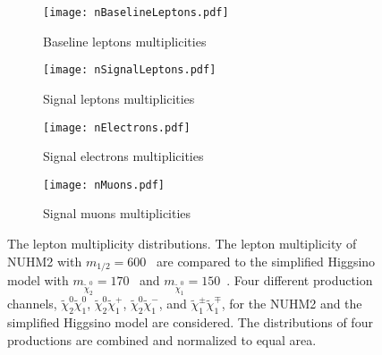 \begin{figure}[htbp]
    \begin{center}
        \begin{subfigure}[b]{0.48\textwidth}
            \texttt{[image: nBaselineLeptons.pdf]}
            \caption{Baseline leptons multiplicities}
        \end{subfigure}
        \begin{subfigure}[b]{0.48\textwidth}
            \texttt{[image: nSignalLeptons.pdf]}
            \caption{Signal leptons multiplicities}
        \end{subfigure}
        \begin{subfigure}[b]{0.48\textwidth}
            \texttt{[image: nElectrons.pdf]}
            \caption{Signal electrons multiplicities}
        \end{subfigure}
        \begin{subfigure}[b]{0.48\textwidth}
            \texttt{[image: nMuons.pdf]}
            \caption{Signal muons multiplicities}
        \end{subfigure}
    \end{center}
    \caption{The lepton multiplicity distributions.
    The lepton multiplicity of NUHM2 with $m_{1/2} = 600$~{\GeV} are compared to the simplified Higgsino model with $m_{\widetilde{\chi}^{0}_{2}}=170$~{\GeV} and $m_{\widetilde{\chi}^{0}_{1}}=150$~{\GeV}.
    Four different production channels, $\widetilde{\chi}^{0}_{2}\widetilde{\chi}^{0}_{1}$, $\widetilde{\chi}^{0}_{2}\widetilde{\chi}^{+}_{1}$, $\widetilde{\chi}^{0}_{2}\widetilde{\chi}^{-}_{1}$, and $\widetilde{\chi}^{\pm}_{1}\widetilde{\chi}^{\mp}_{1}$, for the NUHM2 and the simplified Higgsino model are considered.
    The distributions of four productions are combined and normalized to equal area.}
    \label{fig:results_nuhm2_lepton_multiplicity}
\end{figure}

